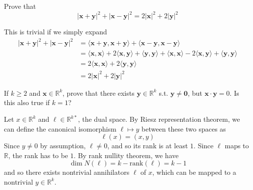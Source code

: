   \begin{exercise}[Rudin 1.17]
    Prove that
    \begin{equation}
      |\mathbf{x} + \mathbf{y}|^2 + |\mathbf{x} - \mathbf{y}|^2 = 2|\mathbf{x}|^2 + 2|\mathbf{y}|^2
    \end{equation}
  \end{exercise}
  \begin{solution}
    This is trivial if we simply expand 
    \begin{align}
      |\mathbf{x} + \mathbf{y}|^2 + |\mathbf{x} - \mathbf{y}|^2 & = \langle \mathbf{x} + \mathbf{y}, \mathbf{x} + \mathbf{y} \rangle + \langle \mathbf{x} - \mathbf{y}, \mathbf{x} - \mathbf{y} \rangle \\
      & = \langle \mathbf{x}, \mathbf{x} \rangle + 2 \langle \mathbf{x}, \mathbf{y} \rangle + \langle \mathbf{y}, \mathbf{y} \rangle + \langle \mathbf{x}, \mathbf{x} \rangle - 2 \langle \mathbf{x}, \mathbf{y} \rangle + \langle \mathbf{y}, \mathbf{y} \rangle \\
      & = 2 \langle \mathbf{x}, \mathbf{x} \rangle + 2 \langle \mathbf{y}, \mathbf{y} \rangle \\
      & = 2|\mathbf{x}|^2 + 2|\mathbf{y}|^2
    \end{align}
  \end{solution}

  \begin{exercise}[Rudin 1.18]
    If $k \geq 2$ and $\mathbf{x} \in \mathbb{R}^k$, prove that there exists $\mathbf{y} \in \mathbb{R}^k$ s.t. $\mathbf{y} \neq \mathbf{0}$, but $\mathbf{x} \cdot \mathbf{y} = 0$. Is this also true if $k = 1$? 
  \end{exercise}
  \begin{solution}
    Let $x \in \mathbb{R}^k$ and $\ell \in \mathbb{R}^{k \ast}$, the dual space. By Riesz representation theorem, we can define the canonical isomorphism $\ell \mapsto y$ between these two spaces as 
    \begin{equation}
      \ell (x) = (x, y)
    \end{equation}
    Since $y \neq 0$ by assumption, $\ell \neq 0$, and so its rank is at least $1$. Since $\ell$ maps to $\mathbb{R}$, the rank has to be $1$. By rank nullity theorem, we have 
    \begin{equation}
      \dim N(\ell) = k - \mathrm{rank}(\ell) = k - 1
    \end{equation}
    and so there exists nontrivial annihilators $\ell$ of $x$, which can be mapped to a nontrivial $y \in \mathbb{R}^k$. 
  \end{solution}

